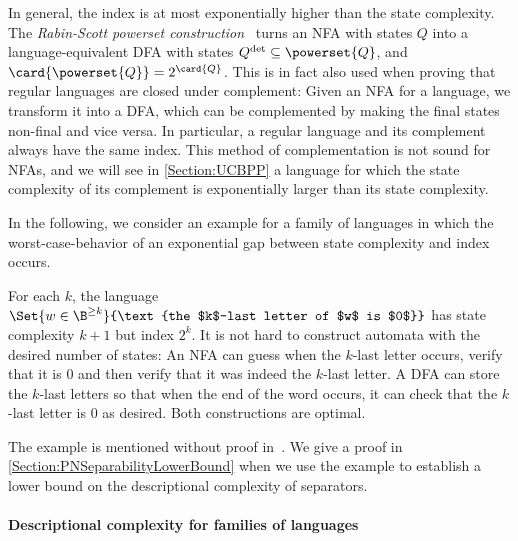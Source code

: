 \documentclass[../../diss.tex]{subfiles}
\begin{document}
In general, the index is at most exponentially higher than the state complexity.
The \emph{Rabin-Scott powerset construction}~\cite{RabinS59} turns an NFA with states $Q$ into a language-equivalent DFA with states $Q^{\det} \subseteq \powerset{Q}$, and $\card{\powerset{Q}} = 2^{\card{Q}}$.
This is in fact also used when proving that regular languages are closed under complement: Given an NFA for a language, we transform it into a DFA, which can be complemented by making the final states non-final and vice versa.
In particular, a regular language and its complement always have the same index.
This method of complementation is not sound for NFAs, and we will see in \cref{Section:UCBPP} a language for which the state complexity of its complement is exponentially larger than its state complexity.

In the following, we consider an example for a family of languages in which the worst-case-behavior of an exponential gap between state complexity and index occurs.

\begin{example}%
\label{Example:StateComplexityVsIndex}%
    For each $k$, the language $\Set{ w \in \B^{\geq k}}{\text{the $k$-last letter of $w$ is $0$}}$ has state complexity $k+1$ but index $2^k$.
    It is not hard to construct automata with the desired number of states:
    An NFA can guess when the $k$-last letter occurs, verify that it is $0$ and then verify that it was indeed the $k$-last letter.
    A DFA can store the $k$-last letters so that when the end of the word occurs, it can check that the $k$-last letter is $0$ as desired.
    Both constructions are optimal.

    The example is mentioned without proof in~\cite{Kozen97}.
    We give a proof in \cref{Section:PNSeparabilityLowerBound} when we use the example to establish a lower bound on the descriptional complexity of separators.
\end{example}

\paragraph{Descriptional complexity for families of languages}
\end{document}
